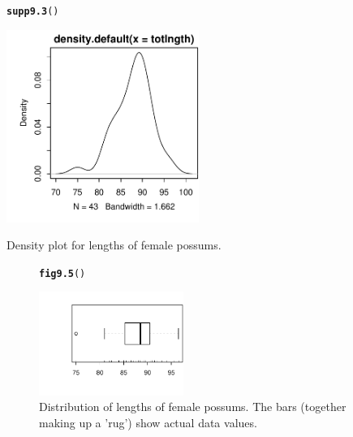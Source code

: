 \documentclass[12pt, a4paper,  BCOR=8.25mm, DIV=15]{scrartcl}\usepackage[]{graphicx}\usepackage[]{color}
\makeatletter
\newcommand{\hlstd}[1]{\textcolor[rgb]{0.345,0.345,0.345}{#1}}%
\newcommand{\hlkwd}[1]{\textcolor[rgb]{0.737,0.353,0.396}{\textbf{#1}}}%
\newenvironment{kframe}{%
 \def\at@end@of@kframe{}%
 \ifinner\ifhmode%
  \def\at@end@of@kframe{\end{minipage}}%
  \begin{minipage}{\columnwidth}%
 \fi\fi%
 \def\FrameCommand##1{\hskip\@totalleftmargin \hskip-\fboxsep
 \colorbox{shadecolor}{##1}\hskip-\fboxsep
     \hskip-\linewidth \hskip-\@totalleftmargin \hskip\columnwidth}%
 \MakeFramed {\advance\hsize-\width
   \@totalleftmargin\z@ \linewidth\hsize
   \@setminipage}}%
 {\par\unskip\endMakeFramed%
 \at@end@of@kframe}
\newenvironment{knitrout}{}{} %
\makeatother
\begin{document}
\begin{suppfigure}
\begin{knitrout}
\color{fgcolor}\begin{kframe}
\begin{alltt}
\hlkwd{supp9.3}\hlstd{()}
\end{alltt}
\end{kframe}

{\centering \includegraphics[width=0.47\textwidth]{figs/gph-supp9_3e-1} 

}



\end{knitrout}
\caption{Density plot for lengths of female possums.}
\end{suppfigure}

\clearpage


\begin{figure}[ht]
\begin{knitrout}
\color{fgcolor}\begin{kframe}
\begin{alltt}
\hlkwd{fig9.5}\hlstd{()}
\end{alltt}
\end{kframe}

{\centering \includegraphics[width=0.42\textwidth]{figs/gph-fig9_5e-1} 

}



\end{knitrout}
\vspace*{-18pt}

\caption{Distribution of lengths of female possums.
The bars (together making up a 'rug') show actual data values.\label{fig:boxrugs}}
\end{figure}
\end{document}
